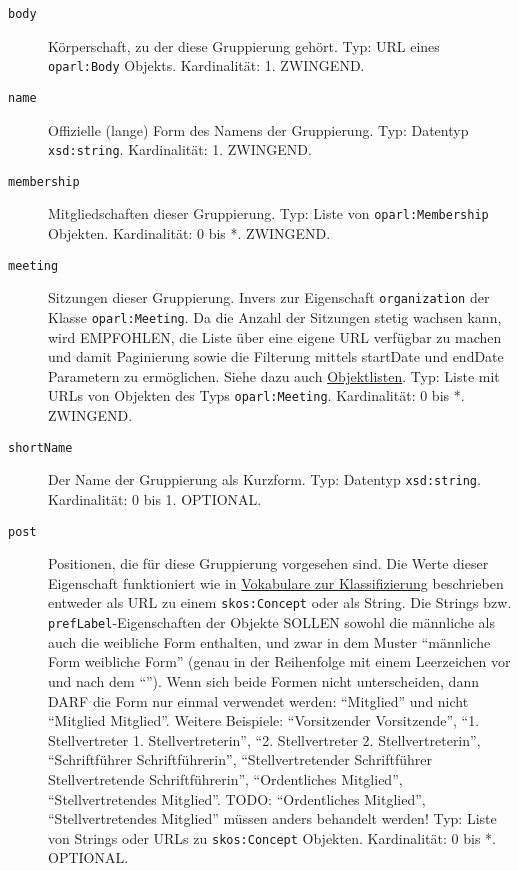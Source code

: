 \documentclass[,a4paper]{article}
\begin{document}
\begin{description}
\item[\texttt{body}]
Körperschaft, zu der diese Gruppierung gehört. Typ: URL eines
\texttt{oparl:Body} Objekts. Kardinalität: 1. ZWINGEND.
\item[\texttt{name}]
Offizielle (lange) Form des Namens der Gruppierung. Typ: Datentyp
\texttt{xsd:string}. Kardinalität: 1. ZWINGEND.
\item[\texttt{membership}]
Mitgliedschaften dieser Gruppierung. Typ: Liste von
\texttt{oparl:Membership} Objekten. Kardinalität: 0 bis *. ZWINGEND.
\item[\texttt{meeting}]
Sitzungen dieser Gruppierung. Invers zur Eigenschaft
\texttt{organization} der Klasse \texttt{oparl:Meeting}. Da die Anzahl
der Sitzungen stetig wachsen kann, wird EMPFOHLEN, die Liste über eine
eigene URL verfügbar zu machen und damit Paginierung sowie die Filterung
mittels startDate und endDate Parametern zu ermöglichen. Siehe dazu auch
\hyperref[objektlisten]{Objektlisten}. Typ: Liste mit URLs von Objekten
des Typs \texttt{oparl:Meeting}. Kardinalität: 0 bis *. ZWINGEND.
\item[\texttt{shortName}]
Der Name der Gruppierung als Kurzform. Typ: Datentyp
\texttt{xsd:string}. Kardinalität: 0 bis 1. OPTIONAL.
\item[\texttt{post}]
Positionen, die für diese Gruppierung vorgesehen sind. Die Werte dieser
Eigenschaft funktioniert wie in
\hyperref[vokabulareux5fklassifizierung]{Vokabulare zur Klassifizierung}
beschrieben entweder als URL zu einem \texttt{skos:Concept} oder als
String. Die Strings bzw. \texttt{prefLabel}-Eigenschaften der Objekte
SOLLEN sowohl die männliche als auch die weibliche Form enthalten, und
zwar in dem Muster ``männliche Form \textbar{} weibliche Form'' (genau
in der Reihenfolge mit einem Leerzeichen vor und nach dem
``\textbar{}''). Wenn sich beide Formen nicht unterscheiden, dann DARF
die Form nur einmal verwendet werden: ``Mitglied'' und nicht ``Mitglied
\textbar{} Mitglied''. Weitere Beispiele: ``Vorsitzender \textbar{}
Vorsitzende'', ``1. Stellvertreter \textbar{} 1. Stellvertreterin'',
``2. Stellvertreter \textbar{} 2. Stellvertreterin'', ``Schriftführer
\textbar{} Schriftführerin'', ``Stellvertretender Schriftführer
\textbar{} Stellvertretende Schriftführerin'', ``Ordentliches
Mitglied'', ``Stellvertretendes Mitglied''. TODO: ``Ordentliches
Mitglied'', ``Stellvertretendes Mitglied'' müssen anders behandelt
werden! Typ: Liste von Strings oder URLs zu \texttt{skos:Concept}
Objekten. Kardinalität: 0 bis *. OPTIONAL.

\end{description}
\end{document}
